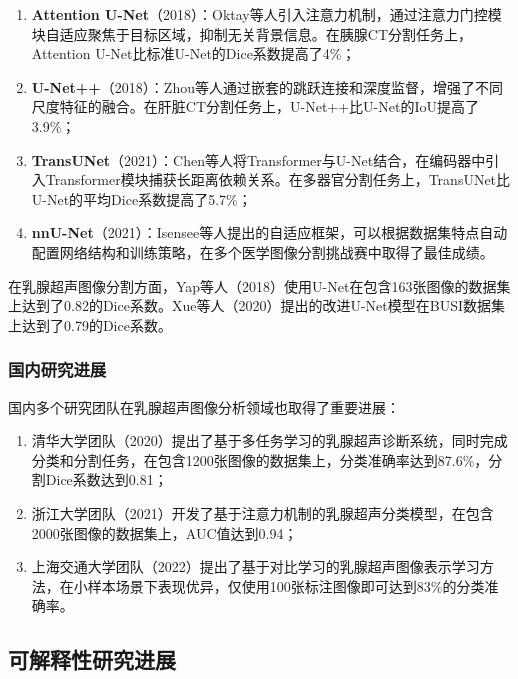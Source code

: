 \documentclass[supercite]{Hust-undergraduate-kaiti}
\theoremstyle{definition}
\begin{document}
\begin{enumerate}
    \item \textbf{Attention U-Net}（2018）：Oktay等人引入注意力机制，通过注意力门控模块自适应聚焦于目标区域，抑制无关背景信息。在胰腺CT分割任务上，Attention U-Net比标准U-Net的Dice系数提高了4\%；
    
    \item \textbf{U-Net++}（2018）：Zhou等人通过嵌套的跳跃连接和深度监督，增强了不同尺度特征的融合。在肝脏CT分割任务上，U-Net++比U-Net的IoU提高了3.9\%；
    
    \item \textbf{TransUNet}（2021）：Chen等人将Transformer与U-Net结合，在编码器中引入Transformer模块捕获长距离依赖关系。在多器官分割任务上，TransUNet比U-Net的平均Dice系数提高了5.7\%；
    
    \item \textbf{nnU-Net}（2021）：Isensee等人提出的自适应框架，可以根据数据集特点自动配置网络结构和训练策略，在多个医学图像分割挑战赛中取得了最佳成绩。
\end{enumerate}

在乳腺超声图像分割方面，Yap等人（2018）使用U-Net在包含163张图像的数据集上达到了0.82的Dice系数。Xue等人（2020）提出的改进U-Net模型在BUSI数据集上达到了0.79的Dice系数。

\subsubsection{国内研究进展}

国内多个研究团队在乳腺超声图像分析领域也取得了重要进展：

\begin{enumerate}
    \item 清华大学团队（2020）提出了基于多任务学习的乳腺超声诊断系统，同时完成分类和分割任务，在包含1200张图像的数据集上，分类准确率达到87.6\%，分割Dice系数达到0.81；
    
    \item 浙江大学团队（2021）开发了基于注意力机制的乳腺超声分类模型，在包含2000张图像的数据集上，AUC值达到0.94；
    
    \item 上海交通大学团队（2022）提出了基于对比学习的乳腺超声图像表示学习方法，在小样本场景下表现优异，仅使用100张标注图像即可达到83\%的分类准确率。
\end{enumerate}

\subsection{可解释性研究进展}
\end{document}
